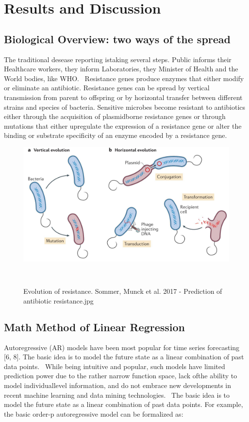 \documentclass[12pt]{article}
\begin{document}
\section{Results and Discussion}
\subsection{Biological Overview: two ways of the spread}
The traditional desease reporting istaking several steps. Public informs their Healthcare workers, they inform Laboratories, they Minister of Health and the World bodies, like WHO.~\cite{Harvard.}
Resistance genes produce enzymes that either modify or eliminate an antibiotic. Resistance genes can be spread by vertical transmission from parent to offspring or by horizontal transfer between different strains and species of bacteria. Sensitive microbes become resistant to antibiotics either through the acquisition of plasmidborne resistance genes or through mutations that either upregulate the expression of a resistance gene or alter the binding or substrate specificity of an enzyme encoded by a resistance gene.~\cite[S.~1237]{Barlow.2003}

\begin{figure}\includegraphics[width=\textwidth]{Images/f65b4498-79f9-47f3-badf-19f7b1ec7312.jpg}\caption{Evolution of resistance. Sommer, Munck et al. 2017 - Prediction of antibiotic resistance.jpg}
	~\cite[S.~690]{Sommer.2017b}\end{figure}

\subsection{Math Method of Linear Regression}
Autoregressive (AR) models have been most popular for time series forecasting [6, 8]. The basic idea is to model the future state as a linear combination of past data points.~\cite{Cho.03.06.2014b}
While being intuitive and popular, such models have limited prediction power due to the rather narrow function space, lack ofthe ability to model individuallevel information, and do not embrace new developments in recent machine learning and data mining technologies.~\cite{Cho.03.06.2014b}
The basic idea is to model the future state as a linear combination of past data points. For example, the basic order-p autoregressive model can be formalized as:
\end{document}
